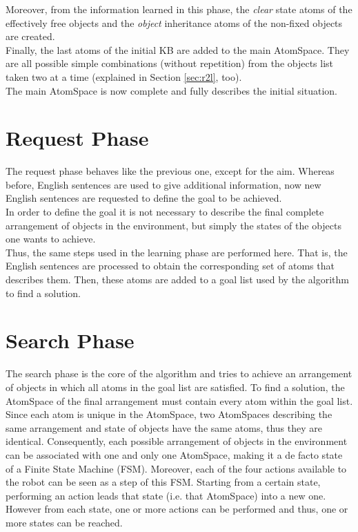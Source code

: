 Moreover, from the information learned in this phase, the \textit{clear} state atoms of the effectively free objects and the \textit{object} inheritance atoms of the non-fixed objects are created.  \\
Finally, the last atoms of the initial KB are added to the main AtomSpace. They are all possible simple combinations (without repetition) from the objects list taken two at a time (explained in Section \ref{sec:r2l}, too). \\
The main AtomSpace is now complete and fully describes the initial situation. 

\section{Request Phase}\label{sec:request}

The request phase behaves like the previous one, except for the aim. Whereas before, English sentences are used to give additional information, now new English sentences are requested to define the goal to be achieved. \\
In order to define the goal it is not necessary to describe the final complete arrangement of objects in the environment, but simply the states of the objects one wants to achieve. \\
Thus, the same steps used in the learning phase are performed here. That is, the English sentences are processed to obtain the corresponding set of atoms that describes them. Then, these atoms are added to a goal list used by the algorithm to find a solution.

\section{Search Phase}\label{sec:search}

The search phase is the core of the algorithm and tries to achieve an arrangement of objects in which all atoms in the goal list are satisfied.
To find a solution, the AtomSpace of the final arrangement must contain every atom within the goal list. \\

Since each atom is unique in the AtomSpace, two AtomSpaces describing the same arrangement and state of objects have the same atoms, thus they are identical. 
Consequently, each possible arrangement of objects in the environment can be associated with one and only one AtomSpace, making it a de facto state of a Finite State Machine (FSM).
Moreover, each of the four actions available to the robot can be seen as a step of this FSM. 
Starting from a certain state, performing an action leads that state (i.e. that AtomSpace) into a new one. However from each state, one or more actions can be performed and thus, one or more states can be reached. \\

